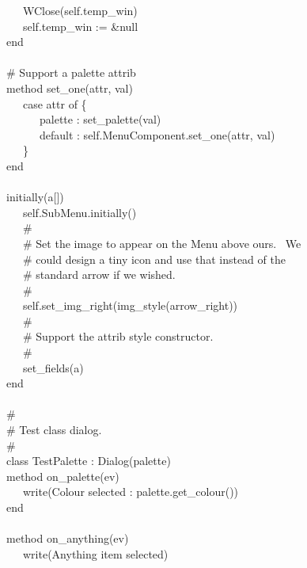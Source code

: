 {\>   \ \ \ WClose(self.temp\_win) \\
\>   \ \ \ self.temp\_win := \&null \\
\>   end \\
\ \\
\>   \# Support a {\textquotedbl}palette{\textquotedbl} attrib \\
\>   method set\_one(attr, val) \\
\>   \ \ \ case attr of \{ \\
\>   \ \ \ \ \ \ {\textquotedbl}palette{\textquotedbl} :
set\_palette(val) \\
\>   \ \ \ \ \ \ default : self.MenuComponent.set\_one(attr, val) \\
\>   \ \ \ \} \\
\>   end \\
\ \\
\>   initially(a[]) \\
\>   \ \ \ self.SubMenu.initially() \\
\>   \ \ \ \# \\
\>   \ \ \ \# Set the image to appear on the Menu above ours. \ We \\
\>   \ \ \ \# could design a tiny icon and use that instead of the \\
\>   \ \ \ \# standard arrow if we wished. \\
\>   \ \ \ \#  \\
\>   \ \ \ self.set\_img\_right(img\_style({\textquotedbl}arrow\_right{\textquotedbl})) \\
\>   \ \ \ \# \\
\>   \ \ \ \# Support the attrib style constructor. \\
\>   \ \ \ \# \\
\>   \ \ \ set\_fields(a) \\
end \\
\ \\
\# \\
\# Test class dialog. \\
\# \\
class TestPalette : Dialog(palette) \\
\>   method on\_palette(ev) \\
\>   \ \ \ write({\textquotedbl}Colour selected : {\textquotedbl}
{\textbar}{\textbar} palette.get\_colour()) \\
\>   end \\
\ \\
\>   method on\_anything(ev) \\
\>   \ \ \ write({\textquotedbl}Anything item selected{\textquotedbl}) \\
}
